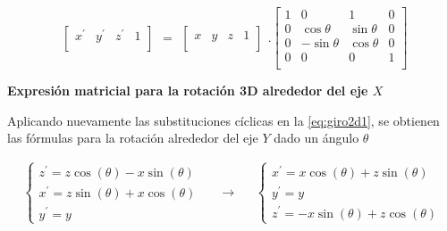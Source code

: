 \begin{equation}
\begin{array}{rccl}
\left[
\begin{array}{rccl}
{x}^{\prime} & {y}^{\prime} & {z}^{\prime} & 1\\
\end{array}
\right]
\end{array}
=
\begin{array}{rccl}
\left[
\begin{array}{rccl}
x & y & z & 1\\
\end{array}
\right]
\end{array} 
.
\left[
\begin{array}{rccl}
1 & 0 & 1 & 0\\
0 & \cos\theta & \sin\theta &  0\\
0 & -\sin\theta & \cos\theta & 0 \\
0 & 0 & 0 & 1\\
\end{array}
\right]
\end{equation}

\begin{center}
\textbf{\footnotesize{Expresión matricial para la rotación 3D alrededor del eje $X$}}
\end{center}

Aplicando nuevamente las substituciones cíclicas en la \ref{eq:giro2d1}, se obtienen las fórmulas para la rotación alrededor del eje $Y$ dado un ángulo $\theta$

\begin{equation}
  \begin{split}
   \begin{cases}
{z}^{\prime} = z \cos(\theta) -x \sin(\theta) \\ 
{x}^{\prime} = z \sin(\theta) +x \cos(\theta) \\
{y}^{\prime} = y
\end{cases}
  \end{split}
\quad\longrightarrow\quad
  \begin{split}
   \begin{cases}
{x}^{\prime} = x \cos(\theta) + z\sin(\theta) \\ 
{y}^{\prime} = y \\
{z}^{\prime} = -x \sin(\theta) + z \cos(\theta)
\end{cases}
\end{split}
\end{equation}

